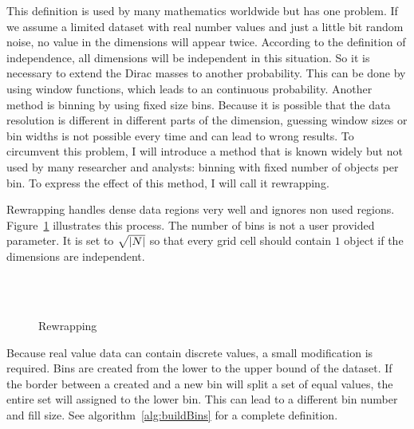 This definition is used by many mathematics worldwide but has one problem. If we assume a limited dataset with real number values and just a little bit random noise, no value in the dimensions will appear twice. According to the definition of independence, all dimensions will be independent in this situation. So it is necessary to extend the Dirac masses to another probability. This can be done by using window functions, which leads to an continuous probability. Another method is binning by using fixed size bins. Because it is possible that the data resolution is different in different parts of the dimension, guessing window sizes or bin widths is not possible every time and can lead to wrong results. To circumvent this problem, I will introduce a method that is known widely but not used by many researcher and analysts: binning with fixed number of objects per bin. To express the effect of this method, I will call it rewrapping.

Rewrapping handles dense data regions very well and ignores non used regions. Figure~\ref{fig:rewrap} illustrates this process. The number of bins is not a user provided parameter. It is set to $\sqrt{\left|N\right|}$ so that every grid cell should contain $1$ object if the dimensions are independent.

\begin{figure}
	\caption{Rewrapping}
	\label{fig:rewrap}
	\centering
	\hfill
	\\
	\hfill
	\\
	\hfill
\end{figure}

Because real value data can contain discrete values, a small modification is required. Bins are created from the lower to the upper bound of the dataset. If the border between a created and a new bin will split a set of equal values, the entire set will assigned to the lower bin. This can lead to a different bin number and fill size. See algorithm~\ref{alg:buildBins} for a complete definition.

